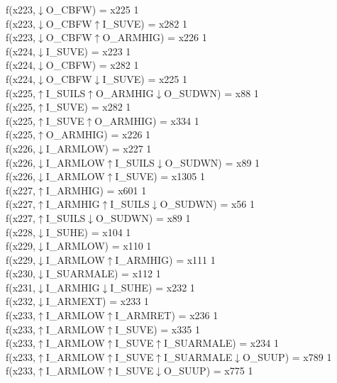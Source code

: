 f(x223,$\downarrow$O\_CBFW) = x225 {1} \\
f(x223,$\downarrow$O\_CBFW$\uparrow$I\_SUVE) = x282 {1} \\
f(x223,$\downarrow$O\_CBFW$\uparrow$O\_ARMHIG) = x226 {1} \\
f(x224,$\downarrow$I\_SUVE) = x223 {1} \\
f(x224,$\downarrow$O\_CBFW) = x282 {1} \\
f(x224,$\downarrow$O\_CBFW$\downarrow$I\_SUVE) = x225 {1} \\
f(x225,$\uparrow$I\_SUILS$\uparrow$O\_ARMHIG$\downarrow$O\_SUDWN) = x88 {1} \\
f(x225,$\uparrow$I\_SUVE) = x282 {1} \\
f(x225,$\uparrow$I\_SUVE$\uparrow$O\_ARMHIG) = x334 {1} \\
f(x225,$\uparrow$O\_ARMHIG) = x226 {1} \\
f(x226,$\downarrow$I\_ARMLOW) = x227 {1} \\
f(x226,$\downarrow$I\_ARMLOW$\uparrow$I\_SUILS$\downarrow$O\_SUDWN) = x89 {1} \\
f(x226,$\downarrow$I\_ARMLOW$\uparrow$I\_SUVE) = x1305 {1} \\
f(x227,$\uparrow$I\_ARMHIG) = x601 {1} \\
f(x227,$\uparrow$I\_ARMHIG$\uparrow$I\_SUILS$\downarrow$O\_SUDWN) = x56 {1} \\
f(x227,$\uparrow$I\_SUILS$\downarrow$O\_SUDWN) = x89 {1} \\
f(x228,$\downarrow$I\_SUHE) = x104 {1} \\
f(x229,$\downarrow$I\_ARMLOW) = x110 {1} \\
f(x229,$\downarrow$I\_ARMLOW$\uparrow$I\_ARMHIG) = x111 {1} \\
f(x230,$\downarrow$I\_SUARMALE) = x112 {1} \\
f(x231,$\downarrow$I\_ARMHIG$\downarrow$I\_SUHE) = x232 {1} \\
f(x232,$\downarrow$I\_ARMEXT) = x233 {1} \\
f(x233,$\uparrow$I\_ARMLOW$\uparrow$I\_ARMRET) = x236 {1} \\
f(x233,$\uparrow$I\_ARMLOW$\uparrow$I\_SUVE) = x335 {1} \\
f(x233,$\uparrow$I\_ARMLOW$\uparrow$I\_SUVE$\uparrow$I\_SUARMALE) = x234 {1} \\
f(x233,$\uparrow$I\_ARMLOW$\uparrow$I\_SUVE$\uparrow$I\_SUARMALE$\downarrow$O\_SUUP) = x789 {1} \\
f(x233,$\uparrow$I\_ARMLOW$\uparrow$I\_SUVE$\downarrow$O\_SUUP) = x775 {1} \\
